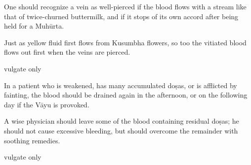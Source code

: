 \begin{translation}
\begin{tt}
\item[11]
One should recognize a vein as well-pierced if the blood flows with a stream like that of twice-churned buttermilk, and if it stops of its own accord after being held for a Muhūrta.

\item[12]
Just as yellow fluid first flows from Kusumbha flowers, so too the vitiated blood flows out first when the veins are pierced.

\item[13]  vulgate only

\item[14]
In a patient who is weakened, has many accumulated doṣas, or is afflicted by fainting, the blood should be drained again in the afternoon, or on the following day if the Vāyu is provoked.

\item[15]
A wise physician should leave some of the blood containing residual doṣas; he should not cause excessive bleeding, but should overcome the remainder with soothing remedies.

\item[16]  vulgate only


\end{tt}
\end{translation}
